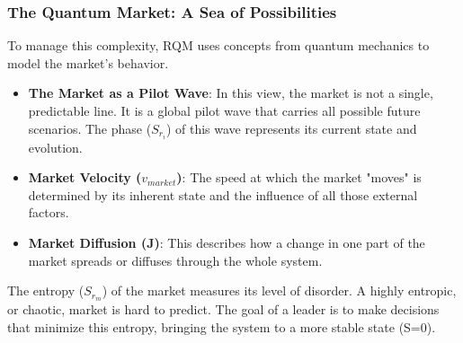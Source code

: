 \documentclass{article}
\begin{document}
\subsubsection*{The Quantum Market: A Sea of Possibilities}
To manage this complexity, RQM uses concepts from quantum mechanics to model the market's behavior.
\begin{itemize}
\item \textbf{The Market as a Pilot Wave}: In this view, the market is not a single, predictable line. It is a global pilot wave that carries all possible future scenarios. The phase ($S_{r_i}$) of this wave represents its current state and evolution.
\item \textbf{Market Velocity ($v_{market}$)}: The speed at which the market "moves" is determined by its inherent state and the influence of all those external factors.
\item \textbf{Market Diffusion (J)}: This describes how a change in one part of the market spreads or diffuses through the whole system.
\end{itemize}
The entropy ($S_{r_m}$) of the market measures its level of disorder. A highly entropic, or chaotic, market is hard to predict. The goal of a leader is to make decisions that minimize this entropy, bringing the system to a more stable state (S=0).
\end{document}
